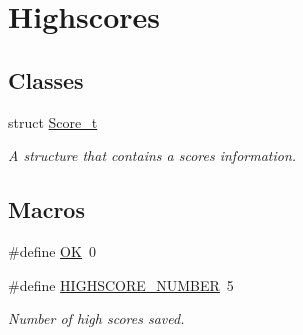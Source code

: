 \hypertarget{group___highscores}{}\section{Highscores}
\label{group___highscores}
\subsection*{Classes}
\begin{DoxyCompactItemize}
\item 
struct \hyperlink{struct_score__t}{Score\+\_\+t}
\begin{DoxyCompactList}\small\item\em A structure that contains a score\textquotesingle{}s information. \end{DoxyCompactList}\end{DoxyCompactItemize}
\subsection*{Macros}
\begin{DoxyCompactItemize}
\item 
\#define \hyperlink{group___highscores_gaba51915c87d64af47fb1cc59348961c9}{OK}~0
\item 
\#define \hyperlink{group___highscores_ga1942001a3372417b1fa0106acef995b3}{H\+I\+G\+H\+S\+C\+O\+R\+E\+\_\+\+N\+U\+M\+B\+ER}~5
\begin{DoxyCompactList}\small\item\em Number of high scores saved. \end{DoxyCompactList}\end{DoxyCompactItemize}
